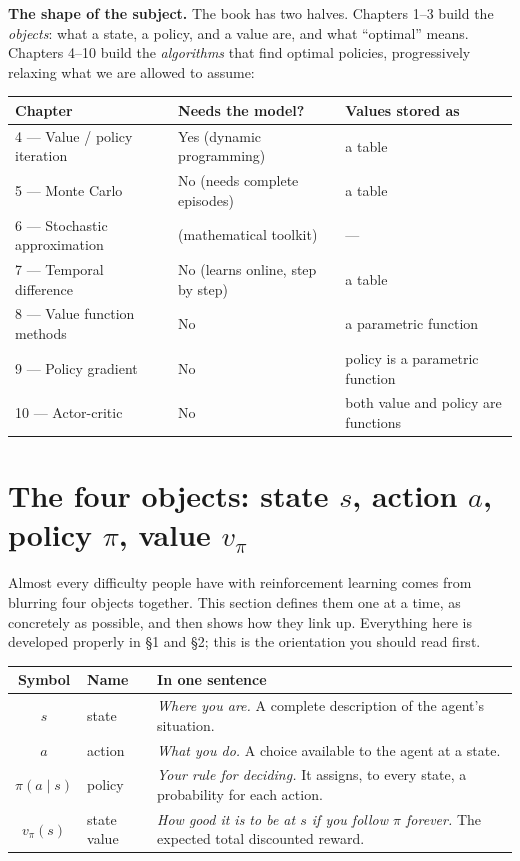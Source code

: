 \documentclass[11pt, letterpaper]{article}
\theoremstyle{runin}
\theoremstyle{runinplain}
\theoremstyle{remark}
\begin{document}
\textbf{The shape of the subject.} The book has two halves. Chapters 1--3 build
the \emph{objects}: what a state, a policy, and a value are, and what ``optimal''
means. Chapters 4--10 build the \emph{algorithms} that find optimal policies,
progressively relaxing what we are allowed to assume:

\begin{center}
\small
\begin{tabular}{@{}lll@{}}
\toprule
Chapter & Needs the model? & Values stored as \\
\midrule
4 --- Value / policy iteration & Yes (dynamic programming) & a table \\
5 --- Monte Carlo & No (needs complete episodes) & a table \\
6 --- Stochastic approximation & (mathematical toolkit) & --- \\
7 --- Temporal difference & No (learns online, step by step) & a table \\
8 --- Value function methods & No & a parametric function \\
9 --- Policy gradient & No & policy is a parametric function \\
10 --- Actor-critic & No & both value and policy are functions \\
\bottomrule
\end{tabular}
\end{center}

\newpage
\section*{The four objects: state $s$, action $a$, policy $\pi$, value $v_\pi$}

Almost every difficulty people have with reinforcement learning comes from blurring
four objects together. This section defines them one at a time, as concretely as
possible, and then shows how they link up. Everything here is developed properly in
\S1 and \S2; this is the orientation you should read first.

\begin{center}
\small
\begin{tabular}{@{}clp{}@{}}
\toprule
Symbol & Name & In one sentence \\
\midrule
$s$ & state & \emph{Where you are.} A complete description of the agent's situation. \\
$a$ & action & \emph{What you do.} A choice available to the agent at a state. \\
$\pi(a\mid s)$ & policy & \emph{Your rule for deciding.} It assigns, to every state, a probability for each action. \\
$v_\pi(s)$ & state value & \emph{How good it is to be at $s$ if you follow $\pi$ forever.} The expected total discounted reward. \\
\bottomrule
\end{tabular}
\end{center}
\end{document}
